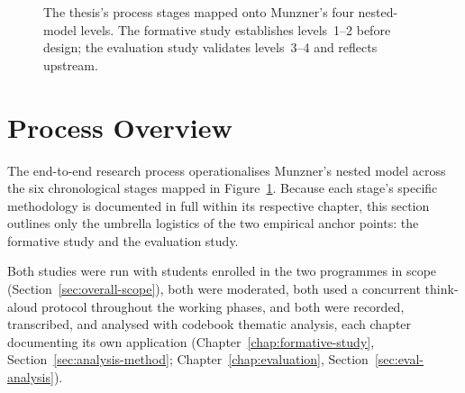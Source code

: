 \begin{figure}[htbp]
\caption{The thesis's process stages mapped onto Munzner's four nested-model levels. The formative study establishes levels~1--2 before design; the evaluation study validates levels~3--4 and reflects upstream.}
\label{fig:nested-model-mapping}
\end{figure}




\section{Process Overview}
\label{sec:process-overview}
The end-to-end research process operationalises Munzner's nested model across the six chronological stages mapped in Figure~\ref{fig:nested-model-mapping}. Because each stage's specific methodology is documented in full within its respective chapter, this section outlines only the umbrella logistics of the two empirical anchor points: the formative study and the evaluation study.

Both studies were run with students enrolled in the two programmes in scope (Section~\ref{sec:overall-scope}), both were moderated, both used a concurrent think-aloud protocol throughout the working phases, and both were recorded, transcribed, and analysed with codebook thematic analysis, each chapter documenting its own application (Chapter~\ref{chap:formative-study}, Section~\ref{sec:analysis-method}; Chapter~\ref{chap:evaluation}, Section~\ref{sec:eval-analysis}).


